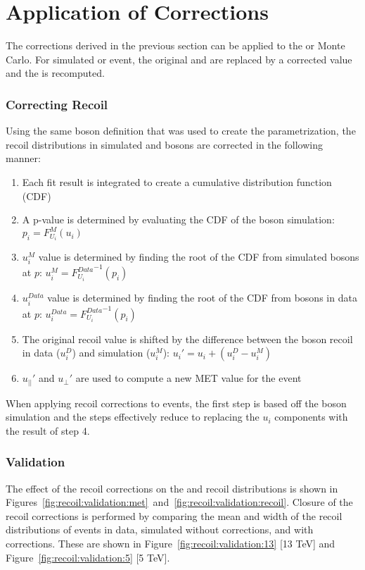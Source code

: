 \section{Application of Corrections}\label{ch:recoil:apply}
The corrections derived in the previous section can be applied to the \W or \Z Monte Carlo. For simulated \W or \Z event, the original \upar and \uprp are replaced by a corrected value and the \met is recomputed. 
\subsubsection{Correcting Recoil} \label{ch10:recoil:apply}
Using the same boson \pt definition that was used to create the parametrization, the recoil distributions in simulated \W and \Z bosons are corrected in the following manner: 
\begin{enumerate}
    \item Each fit result is integrated to create a cumulative distribution function (CDF)
    \item A p-value is determined by evaluating the CDF of the \W boson simulation: $p_{i}=F_{U_{i}}^{M}(u_{i})$
    \item $u_i^{M}$ value is determined by finding the root of the CDF from simulated \Z bosons at $p$: $u_{i}^{M}={F_{U_{i}}^{Data}}^{-1}(p_{i})$
    \item $u_i^{Data}$ value is determined  by finding the root of the CDF from \Z bosons in data at $p$: $u_{i}^{Data}={F_{U_{i}}^{Data}}^{-1}(p_{i})$
    \item The original recoil value is shifted by the difference between the \Z boson recoil in data ($u_i^D$) and simulation ($u_i^M$):  $u_{i}' = u_{i} + (u_i^D - u_i^M) $
    \item $u_{||}'$ and $u_{\perp}'$ are used to compute a new MET value for the event
\end{enumerate}
When applying recoil corrections to \zll events, the first step is based off the \Z boson simulation and the steps effectively reduce to replacing the $u_{i}$ components with the result of step 4. 

\subsubsection{Validation}
The effect of the recoil corrections on the \zmm \met and recoil distributions is shown in Figures~\ref{fig:recoil:validation:met}~and~\ref{fig:recoil:validation:recoil}. Closure of the recoil corrections is performed by comparing the mean and width of the recoil distributions of \zll events in data, simulated \zll without corrections, and \zll with corrections. These are shown in Figure~\ref{fig:recoil:validation:13} [13 TeV] and Figure~\ref{fig:recoil:validation:5} [5 TeV].







